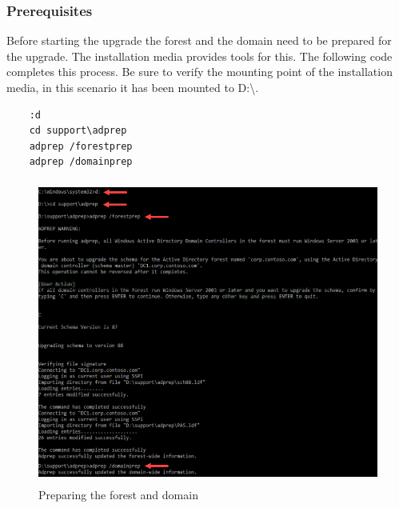 \subsubsection{Prerequisites}
Before starting the upgrade the forest and the domain need to be prepared for the upgrade. The installation media provides tools for this. The following code completes this process. Be sure to verify the mounting point of the installation media, in this scenario it has been mounted to D:\textbackslash .

\begin{lstlisting}
	:d
	cd support\adprep
	adprep /forestprep
	adprep /domainprep
\end{lstlisting}
\begin{figure}[h]
	\includegraphics[width=0.9\linewidth,height=10cm]{img/In-Place_WS_1.png}
	\captionsetup{width=0.8\linewidth}
	\centering		
	\caption{Preparing the forest and domain}
	\label{fig:inplace1}
\end{figure}

